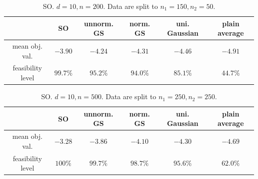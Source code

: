 \documentclass[mnsc,blindrev]{informs4} %
\begin{document}
\begin{table}[h]
\caption{SO. $d=10,n=200$. Data are split to $n_1=150,n_2=50$.}
\begin{center}
\begin{tabular}{|c|c|c|c|c|c|}
\hline
&SO&unnorm. GS&norm. GS&uni. Gaussian&plain average\\\hline
mean obj. val.&$-3.90$&$-4.24$&$-4.31$&$-4.46$&$-4.91$\\\hline
feasibility level&$99.7\%$&$95.2\%$&$94.0\%$&$85.1\%$&$44.7\%$\\\hline
\end{tabular}
\end{center}
\label{SO_10_200}
\end{table}%
\begin{table}[h]
\caption{SO. $d=10,n=500$. Data are split to $n_1=250,n_2=250$.}
\begin{center}
\begin{tabular}{|c|c|c|c|c|c|}
\hline
&SO&unnorm. GS&norm. GS&uni. Gaussian&plain average\\\hline
mean obj. val.&$-3.28$&$-3.86$&$-4.10$&$-4.30$&$-4.69$\\\hline
feasibility level&$100\%$&$99.7\%$&$98.7\%$&$95.6\%$&$62.0\%$\\\hline
\end{tabular}
\end{center}
\label{SO_10_500}
\end{table}%
\end{document}
